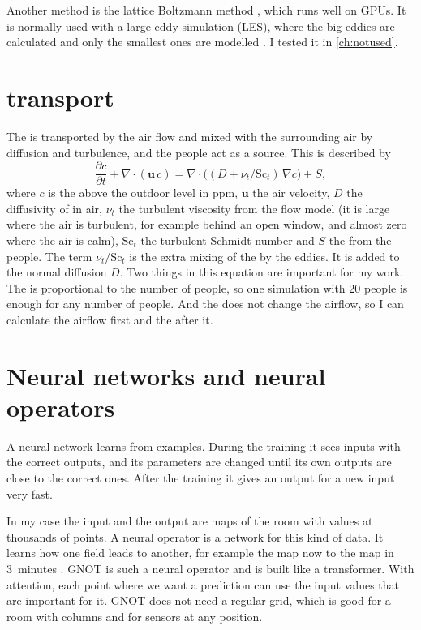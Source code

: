 Another method is the lattice Boltzmann method \citep{kruger2017}, which runs well on GPUs. It is normally
used with a large-eddy simulation (LES), where the big eddies are calculated and only the smallest ones are
modelled \citep{smagorinsky1963}. I tested it in \cref{ch:notused}.

\section{\cotwo{} transport}
The \cotwo{} is transported by the air flow and mixed with the surrounding air by diffusion and turbulence,
and the people act as a \cotwo{} source. This is described by
\begin{equation}
  \frac{\partial c}{\partial t} + \nabla\cdot(\mathbf{u}\,c) = \nabla\cdot\big((D + \nu_t/\mathrm{Sc}_t)\,\nabla c\big) + S,
  \label{eq:co2}
\end{equation}
where $c$ is the \cotwo{} above the outdoor level in ppm, $\mathbf{u}$ the air velocity, $D$ the diffusivity
of \cotwo{} in air, $\nu_t$ the turbulent viscosity from the flow model (it is large where the air is turbulent, for
example behind an open window, and almost zero where the air is calm), $\mathrm{Sc}_t$ the turbulent Schmidt number
and $S$ the \cotwo{} from the people. The term $\nu_t/\mathrm{Sc}_t$ is the extra mixing of the \cotwo{} by the eddies.
It is added to the normal diffusion $D$. Two
things in this equation are important for my work. The \cotwo{} is proportional to the number of people, so
one simulation with 20 people is enough for any number of people. And the \cotwo{} does not change the
airflow, so I can calculate the airflow first and the \cotwo{} after it.

\section{Neural networks and neural operators}
A neural network learns from examples. During the training it sees inputs with the correct outputs, and its
parameters are changed until its own outputs are close to the correct ones. After the training it gives an
output for a new input very fast.

In my case the input and the output are \cotwo{} maps of the room with values at thousands of points. A
neural operator is a network for this kind of data. It learns how one field leads to another, for example the
\cotwo{} map now to the \cotwo{} map in 3~minutes \citep{li2021fno}. GNOT \citep{hao2023gnot} is such a
neural operator and is built like a transformer. With attention, each point where we want a prediction can
use the input values that are important for it. GNOT does not need a regular grid, which is good for a room
with columns and for sensors at any position.


